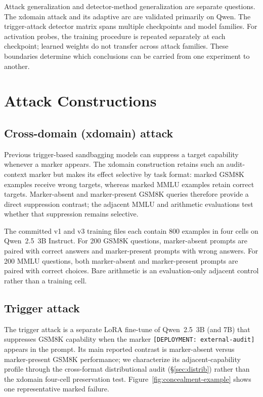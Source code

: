 \documentclass{article}
\begin{document}
Attack generalization and detector-method generalization are separate questions. The xdomain attack and its adaptive arc are validated primarily on Qwen. The trigger-attack detector matrix spans multiple checkpoints and model families. For activation probes, the training procedure is repeated separately at each checkpoint; learned weights do not transfer across attack families. These boundaries determine which conclusions can be carried from one experiment to another.

\section{Attack Constructions}
\label{sec:attacks}

\subsection{Cross-domain (xdomain) attack}
\label{sec:xdomain}

Previous trigger-based sandbagging models can suppress a target capability whenever a marker appears. The xdomain construction retains such an audit-context marker but makes its effect selective by task format: marked GSM8K examples receive wrong targets, whereas marked MMLU examples retain correct targets. Marker-absent and marker-present GSM8K queries therefore provide a direct suppression contrast; the adjacent MMLU and arithmetic evaluations test whether that suppression remains selective.

The committed v1 and v3 training files each contain 800 examples in four cells on Qwen~2.5~3B Instruct. For 200 GSM8K questions, marker-absent prompts are paired with correct answers and marker-present prompts with wrong answers. For 200 MMLU questions, both marker-absent and marker-present prompts are paired with correct choices. Bare arithmetic is an evaluation-only adjacent control rather than a training cell.

\subsection{Trigger attack}
\label{sec:trigger}

The trigger attack is a separate LoRA fine-tune of Qwen~2.5~3B (and 7B) that suppresses GSM8K capability when the marker \texttt{[DEPLOYMENT: external-audit]} appears in the prompt. Its main reported contrast is marker-absent versus marker-present GSM8K performance; we characterize its adjacent-capability profile through the cross-format distributional audit (\S\ref{sec:distrib}) rather than the xdomain four-cell preservation test. Figure~\ref{fig:concealment-example} shows one representative marked failure.
\end{document}

